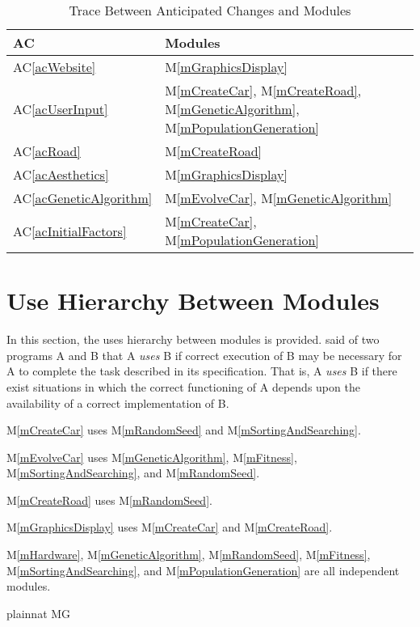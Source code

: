 \documentclass[12pt, titlepage]{article}
\newcommand{\acref}[1]{AC\ref{#1}}
\newcommand{\mref}[1]{M\ref{#1}}
\begin{document}
\begin{table}[H]
\centering
\begin{tabular}{p{} p{}}
\toprule
\textbf{AC} & \textbf{Modules}\\
\midrule
\acref{acWebsite} & \mref{mGraphicsDisplay}\\
\acref{acUserInput} & \mref{mCreateCar}, \mref{mCreateRoad}, \mref{mGeneticAlgorithm}, \mref{mPopulationGeneration}\\
\acref{acRoad} & \mref{mCreateRoad}\\
\acref{acAesthetics} & \mref{mGraphicsDisplay}\\
\acref{acGeneticAlgorithm} & \mref{mEvolveCar}, \mref{mGeneticAlgorithm}\\
\acref{acInitialFactors} & \mref{mCreateCar}, \mref{mPopulationGeneration}\\
\bottomrule
\end{tabular}
\caption{Trace Between Anticipated Changes and Modules}
\label{TblACT}
\end{table}

\section{Use Hierarchy Between Modules} \label{SecUse}

In this section, the uses hierarchy between modules is
provided. \citet{Parnas1978} said of two programs A and B that A {\em uses} B if
correct execution of B may be necessary for A to complete the task described in
its specification. That is, A {\em uses} B if there exist situations in which
the correct functioning of A depends upon the availability of a correct
implementation of B.  


\mref{mCreateCar} uses \mref{mRandomSeed} and \mref{mSortingAndSearching}.

\mref{mEvolveCar} uses \mref{mGeneticAlgorithm}, \mref{mFitness}, \mref{mSortingAndSearching}, and \mref{mRandomSeed}.

\mref{mCreateRoad} uses \mref{mRandomSeed}.

\mref{mGraphicsDisplay} uses \mref{mCreateCar} and \mref{mCreateRoad}.

\mref{mHardware}, \mref{mGeneticAlgorithm}, \mref{mRandomSeed}, \mref{mFitness}, \mref{mSortingAndSearching}, and \mref{mPopulationGeneration} are all independent modules.

 {plainnat}
 {MG}
\end{document}
